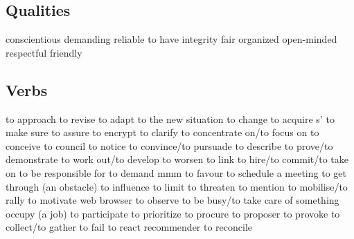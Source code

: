 \subsection*{Qualities}
   {conscientious}
   {demanding}
   {reliable}
   {to have integrity}
   {fair}
   {organized}
   {open-minded}
   {respectful}
   {friendly}


\subsection*{Verbs}
   {to approach}
   {to revise}
   {to adapt}
   {to the new situation}
   {to change}
   {to acquire}
 {s'}   {to make sure}
   {to assure}
   {to encrypt}
   {to clarify}
   {to concentrate on/to focus on}
   {to conceive}
   {to council}
   {to notice}
   {to convince/to pursuade}
   {to describe}
   {to prove/to demonstrate}
   {to work out/to develop}
   {to worsen}
   {to link}
   {to hire/to commit/to take on}
   {to be responsible for}
   {to demand}
   {mmm}
   {to favour}
   {to schedule a meeting}
   {to get through (an obstacle)}
   {to influence}
   {to limit}
   {to threaten}
   {to mention}
   {to mobilise/to rally}
   {to motivate}
   {web browser}
   {to observe}
   {to be busy/to take care of something}
   {occupy (a job)}
   {to participate}
   {to prioritize}
   {to procure}
   {to proposer}
   {to provoke}
   {to collect/to gather}
   {to fail}
   {to react}
   {recommender}
   {to reconcile}
